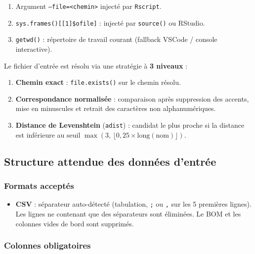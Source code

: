 \documentclass[11pt,a4paper]{article}
\begin{document}
\begin{enumerate}[label=\arabic*.]
  \item Argument \texttt{--file=<chemin>} injecté par \texttt{Rscript}.
  \item \texttt{sys.frames()[[1]\$ofile]} : injecté par \texttt{source()} ou RStudio.
  \item \texttt{getwd()} : répertoire de travail courant (fallback VSCode / console interactive).
\end{enumerate}

Le fichier d'entrée est résolu via une stratégie à \textbf{3 niveaux} :

\begin{enumerate}[label=\arabic*.]
  \item \textbf{Chemin exact} : \texttt{file.exists()} sur le chemin résolu.
  \item \textbf{Correspondance normalisée} : comparaison après suppression des accents, mise en minuscules et retrait des caractères non alphanumériques.
  \item \textbf{Distance de Levenshtein} (\texttt{adist}) : candidat le plus proche si la distance est inférieure au seuil $\max(3,\, \lfloor 0{,}25 \times \text{long}(\text{nom})\rfloor)$.
\end{enumerate}

\subsection{Structure attendue des données d'entrée}

\subsubsection{Formats acceptés}

\begin{itemize}
  \item \textbf{CSV} : séparateur auto-détecté (tabulation, \texttt{;} ou \texttt{,} sur les 5 premières lignes). Les lignes ne contenant que des séparateurs sont éliminées. Le BOM et les colonnes vides de bord sont supprimés.
\end{itemize}

\subsubsection{Colonnes obligatoires}
\end{document}
